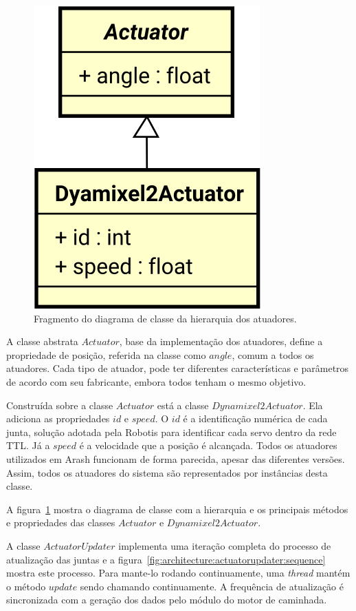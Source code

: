 \begin{figure}[htb]
	\centering
	\includegraphics[scale=0.6]{imagens/svg/softwarearchitecture-actuators-hierarchy}
	\caption{Fragmento do diagrama de classe da hierarquia dos atuadores.}
	\label{fig:architecture:actuator:classdiagram}
\end{figure}

A classe abstrata $Actuator$, base da implementação dos atuadores, define a propriedade de posição, referida na classe como $angle$, comum a todos os atuadores. Cada tipo de atuador, pode ter diferentes características e parâmetros de acordo com seu fabricante, embora todos tenham o mesmo objetivo.

Construída sobre a classe $Actuator$ está a classe $Dynamixel2Actuator$. Ela adiciona as propriedades $id$ e $speed$. O $id$ é a identificação numérica de cada junta, solução adotada pela Robotis para identificar cada servo dentro da rede TTL. Já a $speed$ é a velocidade que a posição é alcançada. Todos os atuadores utilizados em Arash funcionam de forma parecida, apesar das diferentes versões. Assim, todos os atuadores do sistema são representados por instâncias desta classe.

A figura~\ref{fig:architecture:actuator:classdiagram} mostra o diagrama de classe com a hierarquia e os principais métodos e propriedades das classes $Actuator$ e $Dynamixel2Actuator$.

A classe $ActuatorUpdater$ implementa uma iteração completa do processo de atualização das juntas e a figura~\ref{fig:architecture:actuatorupdater:sequence} mostra este processo. Para mante-lo rodando continuamente, uma \textit{thread} mantém o método $update$ sendo chamando continuamente. A frequência de atualização é sincronizada com a geração dos dados pelo módulo do motor de caminhada.

